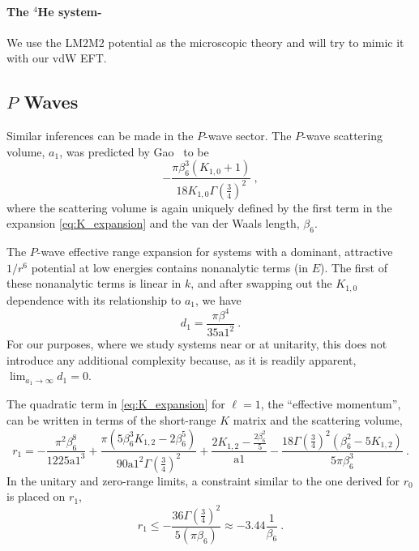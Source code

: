 \documentclass[aps,preprint,superscriptaddress]{revtex4-1}
\begin{document}
\paragraph{\bf The $^4$He system-  } 
We use the LM2M2 potential as the microscopic theory and will try to mimic it with our vdW EFT.
\subsection{$P$ Waves}

Similar inferences can be made in the $P$-wave sector.  The $P$-wave
scattering volume, $a_1$, was predicted by Gao~\cite{PhysRevA.58.4222}
to be
\begin{equation}
  -\frac{\pi  \beta_6 ^3 (K_{1,0}+1)}{18 K_{1,0} \Gamma
  \left(\frac{3}{4}\right)^2}~,
\end{equation}
where the scattering volume is again uniquely defined by the first term in the
expansion \eqref{eq:K_expansion} and the van der Waals length, $\beta_6$.

The $P$-wave effective range expansion for systems with a dominant, attractive
$1/r^6$ potential at low energies contains nonanalytic terms (in $E$).
The first of these nonanalytic terms is linear in $k$, and after swapping out
the $K_{1,0}$ dependence with its relationship to $a_1$, we have
\begin{equation}
  d_1 = \frac{\pi  \beta ^4}{35 \text{a1}^2}~.
\end{equation}
For our purposes, where we study systems near or at unitarity, this does not
introduce any additional complexity because, as it is readily apparent,
$\lim_{a_1\rightarrow\infty}d_1=0$.

The quadratic term in \eqref{eq:K_expansion} for $\ell=1$, the ``effective
momentum'', can be written in terms of the short-range $K$ matrix and the
scattering volume,
\begin{equation}
  r_1 = -\frac{\pi ^2 \beta_6 ^8}{1225 \text{a1}^3}+\frac{\pi  \left(5 \beta_6
      ^3 K_{1,2}-2 \beta_6 ^5\right)}{90 \text{a1}^2 \Gamma
      \left(\frac{3}{4}\right)^2}+\frac{2 K_{1,2}-\frac{2 \beta_6
        ^2}{5}}{\text{a1}}-\frac{18 \Gamma \left(\frac{3}{4}\right)^2
        \left(\beta_6 ^2-5 K_{1,2}\right)}{5 \pi  \beta_6 ^3}~.
\end{equation}
In the unitary and zero-range limits, a constraint similar to the one derived
for $r_0$ is placed on $r_1$,
\begin{equation}
  r_1 \le -\frac{36 \Gamma \left(\frac{3}{4}\right)^2}{5 (\pi  \beta_6 )}
  \approx -3.44 \frac{1}{\beta_6}~.
\end{equation}
\end{document}
